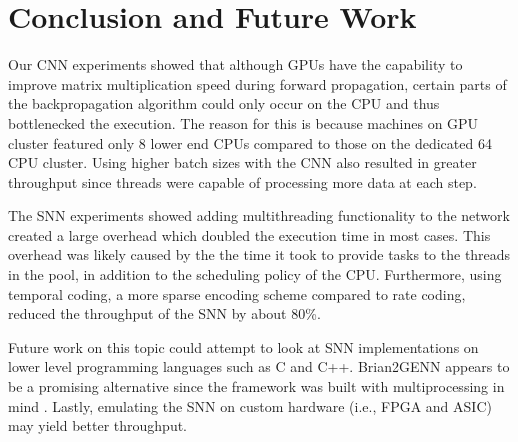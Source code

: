\documentclass[journal]{IEEEtran}
\begin{document}
\section{Conclusion and Future Work}

Our CNN experiments showed that although GPUs have the capability to improve matrix multiplication speed during forward propagation, certain parts of the backpropagation algorithm could only occur on the CPU and thus bottlenecked the execution. The reason for this is because machines on GPU cluster featured only 8 lower end CPUs compared to those on the dedicated 64 CPU cluster. Using higher batch sizes with the CNN also resulted in greater throughput since threads were capable of processing more data at each step.

The SNN experiments showed adding multithreading functionality to the network created a large overhead which doubled the execution time in most cases. This overhead was likely caused by the the time it took to provide tasks to the threads in the pool, in addition to the scheduling policy of the CPU. Furthermore, using temporal coding, a more sparse encoding scheme compared to rate coding, reduced the throughput of the SNN by about 80\%.

Future work on this topic could attempt to look at SNN implementations on lower level programming languages such as C and C++. Brian2GENN appears to be a promising alternative since the framework was built with multiprocessing in mind \cite{stimberg2020brian2genn}. Lastly, emulating the SNN on custom hardware (i.e., FPGA and ASIC) may yield better throughput.



%
\end{document}
